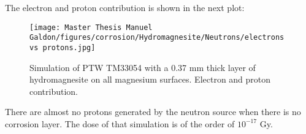 \clearpage
The electron and proton contribution is shown in the next plot:
\begin{figure}[!h]
  \centering
    \centerline{\texttt{[image: Master Thesis Manuel Galdon/figures/corrosion/Hydromagnesite/Neutrons/electrons vs protons.jpg]}}
  \caption{Simulation of PTW TM33054 with a 0.37 \unit{\milli\meter} thick layer of hydromagnesite on all magnesium surfaces. Electron and proton contribution.}
  \label{fig:IC3305 with hydromagnesite, MEDAPP, electorn and proton contribution}
\end{figure}

There are almost no protons generated by the neutron source when there is no corrosion layer. The dose of that simulation is of the order of $10^{-17}$ \unit{\gray}.